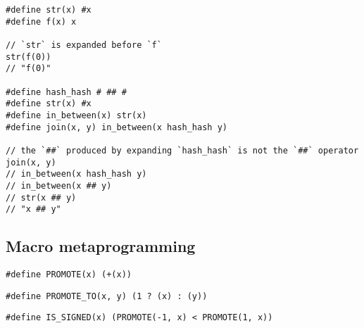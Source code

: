 \begin{lstlisting}[style=c]
#define str(x) #x
#define f(x) x

// `str` is expanded before `f`
str(f(0))
// "f(0)"

#define hash_hash # ## #
#define str(x) #x
#define in_between(x) str(x)
#define join(x, y) in_between(x hash_hash y)

// the `##` produced by expanding `hash_hash` is not the `##` operator
join(x, y)
// in_between(x hash_hash y)
// in_between(x ## y)
// str(x ## y)
// "x ## y"
\end{lstlisting}

\subsection{Macro metaprogramming}

\begin{lstlisting}[style=c]
#define PROMOTE(x) (+(x))
\end{lstlisting}

\begin{lstlisting}[style=c]
#define PROMOTE_TO(x, y) (1 ? (x) : (y))
\end{lstlisting}

\begin{lstlisting}[style=c]
#define IS_SIGNED(x) (PROMOTE(-1, x) < PROMOTE(1, x))
\end{lstlisting}

